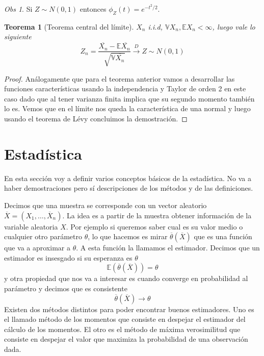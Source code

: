 \documentclass[11pt]{article}
\theoremstyle{plain} %
\newtheorem{teorema}{\color{rojo}Teorema}
\theoremstyle{definition}
\theoremstyle{remark}
\newtheorem{obs}{Obs}
\def\V{\mathbb{V}}
\def\E{\mathbb{E}}
\def\blue{\textcolor{blue!60!black}}
\newcommand{\X}{\overline{X}}
\newcommand{\dist}{\overset{D}{\to}}
\begin{document}
\begin{obs}
	Si $Z \sim N(0,1)$ entonces $\phi_{Z}(t) = e^{-t^{2}/{2}}$.
\end{obs}

\begin{teorema}		
	[Teorema central del límite]
	$X_n$ i.i.d, $\V X_n, \E X_n < \infty$, luego vale lo siguiente 
	\[ Z_n = \dfrac{\overline{X_n}-\E\overline{X_n}}{\sqrt{\V \overline{X_n} }} \dist Z \sim N(0,1) \]
	 
\end{teorema}

\begin{proof}
	Análogamente que para el teorema anterior vamos a desarrollar las funciones características usando la independencia y Taylor de orden 2 en este caso dado que al tener varianza finita implica que su segundo momento también lo es. Vemos que en el límite nos queda la característica de una normal y luego usando el teorema de Lévy concluimos la demostración.
\end{proof}


\bigskip
\section{Estadística}
En esta sección voy a definir varios conceptos básicos de la estadística. No va a haber demostraciones pero sí descripciones de los métodos y de las definiciones.

Decimos que una \blue{muestra} se corresponde con un vector aleatorio $\overline{X} = (X_1 , \dots , \X_n)$. La idea es a partir de la muestra obtener información de la variable aleatoria $X$. Por ejemplo si queremos saber cual es su valor medio o cualquier otro \blue{parámetro} $\theta$, lo que hacemos es mirar $\overline{\theta}(\overline{X})$ que es una función que va a aproximar a $\theta$. A esta función la llamamos el \blue{estimador}. Decimos que un estimador es \blue{insesgado} si su esperanza es  $\theta$
\[ \E \left( \overline{\theta}\left(\overline{X}\right) \right)  = \theta \]
y otra propiedad que nos va a interesar es cuando converge en probabilidad al parámetro y decimos que es \blue{consistente}
\[ \overline{\theta}\left(\overline{X}\right) \to \theta \]
Existen dos métodos distintos para poder encontrar buenos estimadores. Uno es el llamado \blue{método de los momentos} que consiste en despejar el estimador del cálculo de los momentos. El otro es el \blue{método de máxima verosimilitud} que consiste en despejar el valor que maximiza la probabilidad de una observación dada.
\end{document}
